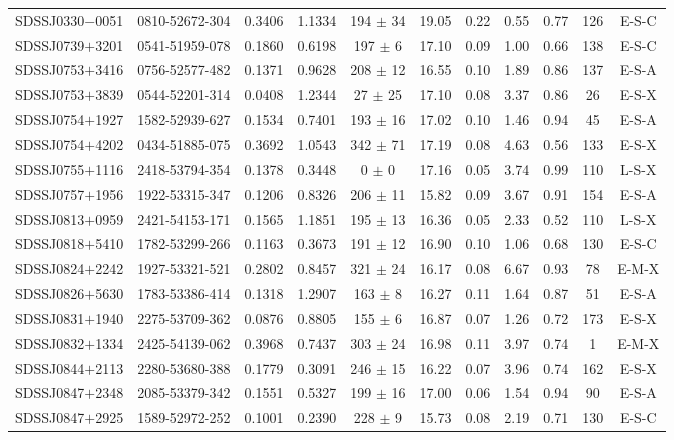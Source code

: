 \documentclass{emulateapj}
\begin{document}
\begin{table*}[htbp]
\begin{center}
\begin{tabular}{c c c c c c c c c c c}
SDSSJ0330$-$0051 & 0810-52672-304 & 0.3406 & 1.1334 & 194 $\pm$   34 & 19.05 & 0.22 & 0.55 & 0.77 & 126 & E-S-C \\ 
SDSSJ0739$+$3201 & 0541-51959-078 & 0.1860 & 0.6198 & 197 $\pm$    6 & 17.10 & 0.09 & 1.00 & 0.66 & 138 & E-S-C \\ 
SDSSJ0753$+$3416 & 0756-52577-482 & 0.1371 & 0.9628 & 208 $\pm$   12 & 16.55 & 0.10 & 1.89 & 0.86 & 137 & E-S-A \\ 
SDSSJ0753$+$3839 & 0544-52201-314 & 0.0408 & 1.2344 & 27 $\pm$   25 & 17.10 & 0.08 & 3.37 & 0.86 & 26 & E-S-X \\ 
SDSSJ0754$+$1927 & 1582-52939-627 & 0.1534 & 0.7401 & 193 $\pm$   16 & 17.02 & 0.10 & 1.46 & 0.94 & 45 & E-S-A \\ 
SDSSJ0754$+$4202 & 0434-51885-075 & 0.3692 & 1.0543 & 342 $\pm$   71 & 17.19 & 0.08 & 4.63 & 0.56 & 133 & E-S-X \\ 
SDSSJ0755$+$1116 & 2418-53794-354 & 0.1378 & 0.3448 & 0 $\pm$    0 & 17.16 & 0.05 & 3.74 & 0.99 & 110 & L-S-X \\ 
SDSSJ0757$+$1956 & 1922-53315-347 & 0.1206 & 0.8326 & 206 $\pm$   11 & 15.82 & 0.09 & 3.67 & 0.91 & 154 & E-S-A \\ 
SDSSJ0813$+$0959 & 2421-54153-171 & 0.1565 & 1.1851 & 195 $\pm$   13 & 16.36 & 0.05 & 2.33 & 0.52 & 110 & L-S-X \\ 
SDSSJ0818$+$5410 & 1782-53299-266 & 0.1163 & 0.3673 & 191 $\pm$   12 & 16.90 & 0.10 & 1.06 & 0.68 & 130 & E-S-C \\ 
SDSSJ0824$+$2242 & 1927-53321-521 & 0.2802 & 0.8457 & 321 $\pm$   24 & 16.17 & 0.08 & 6.67 & 0.93 & 78 & E-M-X \\ 
SDSSJ0826$+$5630 & 1783-53386-414 & 0.1318 & 1.2907 & 163 $\pm$    8 & 16.27 & 0.11 & 1.64 & 0.87 & 51 & E-S-A \\ 
SDSSJ0831$+$1940 & 2275-53709-362 & 0.0876 & 0.8805 & 155 $\pm$    6 & 16.87 & 0.07 & 1.26 & 0.72 & 173 & E-S-X \\ 
SDSSJ0832$+$1334 & 2425-54139-062 & 0.3968 & 0.7437 & 303 $\pm$   24 & 16.98 & 0.11 & 3.97 & 0.74 & 1 & E-M-X \\ 
SDSSJ0844$+$2113 & 2280-53680-388 & 0.1779 & 0.3091 & 246 $\pm$   15 & 16.22 & 0.07 & 3.96 & 0.74 & 162 & E-S-X \\ 
SDSSJ0847$+$2348 & 2085-53379-342 & 0.1551 & 0.5327 & 199 $\pm$   16 & 17.00 & 0.06 & 1.54 & 0.94 & 90 & E-S-A \\ 
SDSSJ0847$+$2925 & 1589-52972-252 & 0.1001 & 0.2390 & 228 $\pm$    9 & 15.73 & 0.08 & 2.19 & 0.71 & 130 & E-S-C \\ 

\end{tabular}
\end{center}
\end{table*}
\end{document}
